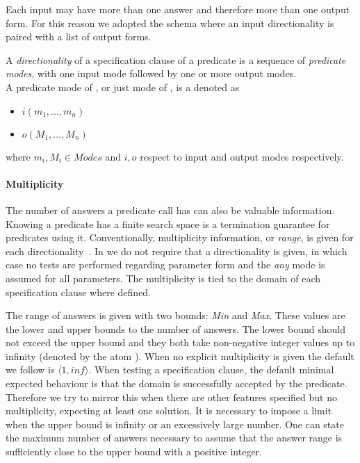 Each input may have more than one answer and therefore more than one
output form.
%
For this reason we adopted the schema where an input directionality is
paired with a list of output forms.


\begin{definition}
\label{def:directionality}
A \emph{directionality} of a specification clause of a predicate
 is a sequence of \emph{predicate modes}, with one input mode
followed by one or more output modes.
\\
A predicate mode of , or just mode of , is a denoted as
\begin{itemize}
  \item $i(m_1, ..., m_n)$
  \item $o(M_1, ..., M_n)$
\end{itemize}
where $m_i,M_i \in Modes$ and $i, o$ respect to input and output modes
respectively.
\end{definition}



\paragraph{\bf Multiplicity}
The number of answers a predicate call has can also be valuable
information.
%
Knowing a predicate has a finite search space is a termination
guarantee for predicates using it.
%
Conventionally, multiplicity information, or \emph{range}, is given for
each directionality~\cite{somogyi1995mercury}.
%
In \plqc{} we do not require that a directionality is given, in which
case no tests are performed regarding parameter form and the \emph{any}
mode is assumed for all parameters.
%
The multiplicity is tied to the domain of each specification clause
where defined.


The range of answers is given with two bounds: \emph{Min} and
\emph{Max}.
%
These values are the lower and upper bounds to the number of answers.
%
The lower bound should not exceed the upper bound and they both take
non-negative integer values up to infinity (denoted by the atom
).
%
When no explicit multiplicity is given the default we %
follow is
$\langle 1, inf \rangle $.
%
When testing a specification clause, the default minimal expected
behaviour is that the domain is successfully accepted by the predicate.
%
Therefore we try to mirror this when there are other features
specified but no multiplicity, expecting at least one solution.
%
It is necessary to impose a limit when the upper bound is infinity or an
excessively large number.
%
One can state the maximum number of answers necessary to assume that the
answer range is sufficiently close to the upper bound with a positive
integer.

